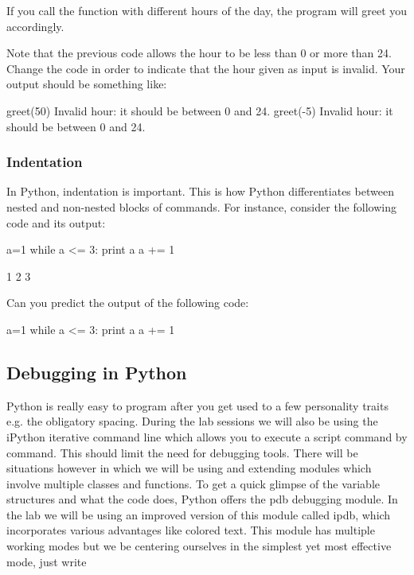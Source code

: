 If you call the function  with different hours of the day, the program will greet you accordingly.

\begin{exercise}
 Note that the previous code allows the hour to be less than 0 or more than 24. Change the code in order to indicate that the hour given as input is invalid. Your output should be something like:

\begin{python}
greet(50)
Invalid hour: it should be between 0 and 24.
greet(-5)
Invalid hour: it should be between 0 and 24.
\end{python}

\end{exercise}

\subsubsection{Indentation}

In Python, indentation is important. This is how Python differentiates between
nested and non-nested blocks of commands. For instance, consider the following
code and its output:

\begin{python}
a=1
while a <= 3:
    print a
    a += 1
\end{python}

\begin{python}
1
2
3
\end{python}


\begin{exercise}
Can you predict the output of the following code:

\begin{python}
a=1
while a <= 3:
    print a
a += 1
\end{python}

\end{exercise}

\subsection{Debugging in Python}

Python is really easy to program after you get used to a few personality traits e.g. the obligatory spacing. During the lab sessions we will also be using the iPython iterative command line which allows you to execute a script command by command. This should limit the need for debugging tools. There will be situations however in which we will be using and extending modules which involve multiple classes and functions. To get a quick glimpse of the variable structures and what the code does, Python offers the pdb debugging module. In the lab we will be using an improved version of this module called ipdb, which incorporates various advantages like colored text. This module has multiple working modes but we be centering ourselves in the simplest yet most effective mode, just write

